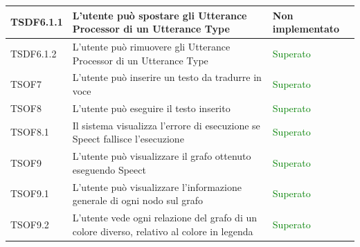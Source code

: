 \documentclass[openany,12pt,a4paper]{report}
\begin{document}
\begin{longtable}{| p{2cm} |p{8cm} | p{2.5cm} |}
	\newline TSDF6.1.1&
	\newline L'utente può spostare gli Utterance Processor di un Utterance Type&
	\newline Non implementato
	\\[1em]
	\hline	
	
	\newline TSDF6.1.2&
	\newline L'utente può rimuovere gli Utterance Processor di un Utterance Type&
	\newline \textcolor{green}{Superato}
	\\[1em]
	\hline	
	
	\newline TSOF7&
	\newline L'utente può inserire un testo da tradurre in voce&
	\newline \textcolor{green}{Superato}
	\\[1em]
	
	\hline
	\newline TSOF8&
	\newline L'utente può eseguire il testo inserito&
	\newline \textcolor{green}{Superato}
	\\[1em]
	\hline
	\newline TSOF8.1&
	\newline Il sistema visualizza l'errore di esecuzione se Speect fallisce l'esecuzione&
	\newline \textcolor{green}{Superato}
	\\[1em]
	\hline
	
	\newline TSOF9&
	\newline L'utente può visualizzare il grafo ottenuto eseguendo Speect&
	\newline \textcolor{green}{Superato}
	\\[1em]
	\hline
	
	
	\newline TSOF9.1&
	\newline L'utente può visualizzare l'informazione generale di ogni nodo sul grafo&
	\newline \textcolor{green}{Superato}
	\\[1em]
	\hline
	
	\newline TSOF9.2&
	\newline L'utente vede ogni relazione del grafo di un colore diverso, relativo al colore in legenda&
	\newline  \textcolor{green}{Superato}
	\\[1em]
	\hline
	

\end{longtable}
\end{document}
